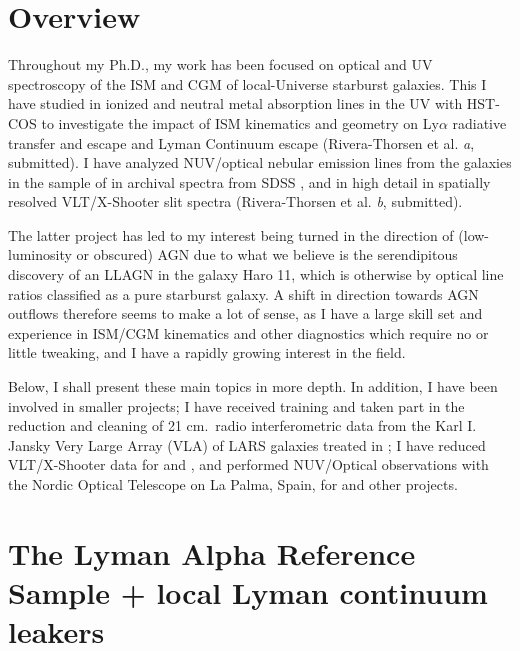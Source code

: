 \documentclass[10pt, letterpaper, headings=Large, DIV=14]{scrartcl}
\date{}                                           %
\begin{document}
{}

\section*{Overview}

Throughout my Ph.D., my work has been focused on optical and UV spectroscopy of
the ISM and CGM of local-Universe starburst galaxies. This I have studied in
ionized and neutral metal absorption lines in the UV with HST-COS to investigate
the impact of ISM kinematics and geometry on Ly$\alpha$ radiative transfer and
escape \citep[see ][]{RiveraThorsen2015} and Lyman Continuum escape
(Rivera-Thorsen et al. \emph{a}, submitted). I have analyzed NUV/optical nebular
emission lines from the galaxies in the sample of \cite{RiveraThorsen2015} in
archival spectra from SDSS \citep{LARSI}, and in high detail in spatially
resolved VLT/X-Shooter slit spectra (Rivera-Thorsen et al. \emph{b}, submitted).

The latter project has led to my interest being turned in the direction of
(low-luminosity or obscured) AGN due to what we believe is the serendipitous
discovery of an LLAGN in the galaxy Haro 11, which is otherwise by optical line
ratios classified as a pure starburst galaxy. A shift in direction towards AGN
outflows therefore seems to make a lot of sense, as I have a large skill set and
experience in ISM/CGM kinematics and other diagnostics which require no or
little tweaking, and I have a rapidly growing interest in the field.

Below, I shall present these main topics in more depth. In addition, I have been
involved in smaller projects; I have received training and taken part in the
reduction and cleaning of 21 cm.\ radio interferometric data from the Karl I.
Jansky Very Large Array (VLA) of LARS galaxies treated in \cite{LARSIII}; I have
reduced VLT/X-Shooter data for \cite{Sandberg2013} and \cite{Stritzinger2014},
and performed NUV/Optical observations with the Nordic Optical Telescope on La
Palma, Spain, for \cite{Sandberg2015} and other projects.



\section*{The Lyman Alpha Reference Sample + local Lyman continuum leakers}
\end{document}
